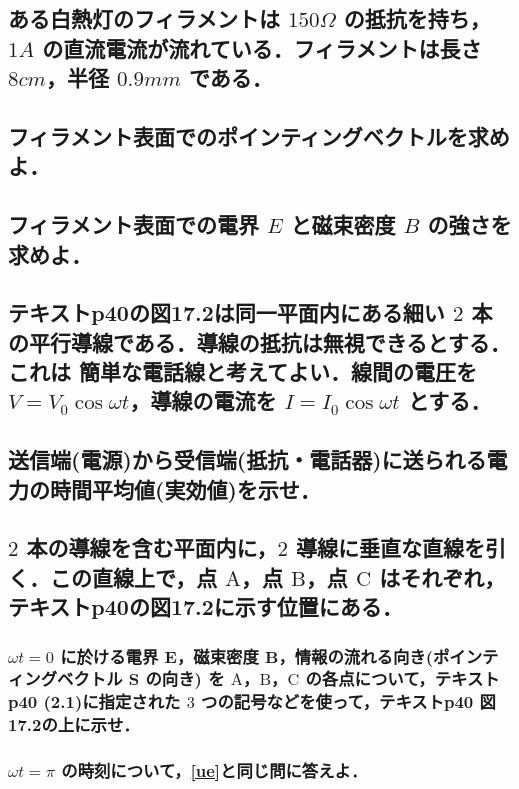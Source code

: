 \documentclass[a4paper, 11pt]{bxjsarticle}
\begin{document}
\newpage

\begin{samepage}
\section{ある白熱灯のフィラメントは \(150\si{\Omega}\) の抵抗を持ち，\(1\si{A}\) の直流電流が流れている．フィラメントは長さ \(8\si{cm}\)，半径 \(0.9\si{mm}\) である．}
\subsection{フィラメント表面でのポインティングベクトルを求めよ．}
\vspace*{25em}
\subsection{フィラメント表面での電界 \(E\) と磁束密度 \(B\) の強さを求めよ．}
\end{samepage}

\newpage

\begin{samepage}
\section{テキストp40の図17.2は同一平面内にある細い \(2\) 本の平行導線である．導線の抵抗は無視できるとする．これは%
簡単な電話線と考えてよい．線間の電圧を \(V=V_0 \cos \omega t\)，導線の電流を \(I = I_0 \cos \omega t\) とする．}
\subsection{送信端(電源)から受信端(抵抗・電話器)に送られる電力の時間平均値(実効値)を示せ．}
\vspace*{13em}
\subsection{\(2\) 本の導線を含む平面内に，\(2\) 導線に垂直な直線を引く．この直線上で，点 \(\mathrm{A}\)，点 \(\mathrm{B}\)，点 \(\mathrm{C}\) はそれぞれ，テキストp40の図17.2に示す位置にある．}
\subsubsection{\(\omega t = 0\) に於ける電界 \(\boldsymbol{E}\)，磁束密度 \(\boldsymbol{B}\)，情報の流れる向き(ポインティングベクトル \(\boldsymbol S\) の向き) を \(\mathrm{A}\)，\(\mathrm{B}\)，\(\mathrm{C}\) の各点について，テキストp40 (2.1)に指定された \(3\) つの記号などを使って，テキストp40 図17.2の上に示せ．\label{ue}}
\vspace*{13em}
\subsubsection{\(\omega t = \pi\) の時刻について，\ref{ue}と同じ問に答えよ．}
\end{samepage}
\end{document}
